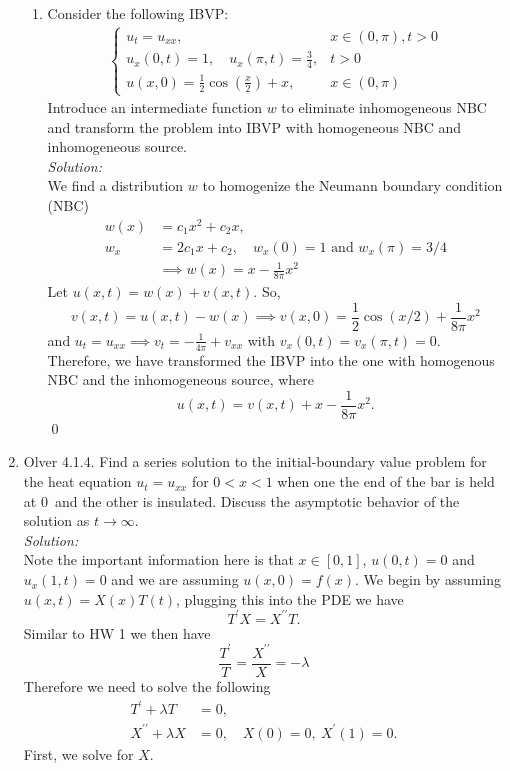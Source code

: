 \documentclass[10pt]{amsart}
\theoremstyle{nonumberplain}
\begin{document}
\begin{enumerate}[label={\bf {\arabic*}:}]
\begin{enumerate}
\item Consider the following IBVP:
\begin{align*}
\begin{cases}
u_t = u_{xx}, &x \in (0, \pi), t > 0 \\
u_x(0, t) = 1, \quad u_x(\pi, t) = \frac 3 4, & t > 0 \\
u(x, 0) = \frac 1 2 \cos \left( \frac x 2 \right) + x, &x \in (0, \pi)
\end{cases}
\end{align*}
Introduce an intermediate function $w$ to eliminate inhomogeneous NBC and transform the problem into IBVP with homogeneous NBC and inhomogeneous source. \\

\noindent
\textit{Solution:} \\
We find a distribution $w$ to homogenize the Neumann boundary condition (NBC)
\begin{align*}
w(x) &= c_1x^2 + c_2x, \\
w_x &= 2c_1x + c_2, \quad w_x(0) = 1 \text{ and } w_x(\pi) = 3/4 \\
&\implies w(x) = x- \frac 1 {8 \pi}x^2
\end{align*}
Let $u(x, t) = w(x) + v(x, t)$.
So, 
$$
v(x, t) = u(x, t) - w(x) \implies v(x, 0) = \frac 1 2 \cos (x/2) + \frac 1 {8 \pi} x^2
$$
and $u_t = u_{xx} \implies v_t = -\frac 1 {4 \pi} + v_{xx}$ with $v_x(0, t) = v_x(\pi, t) = 0$.
Therefore, we have transformed the IBVP into the one with homogenous NBC and the inhomogeneous source, where
$$
u(x, t) = v(x, t) + x - \frac 1 {8 \pi}x^2.
$$
\qed \\

\end{enumerate}

\newpage

\item Olver 4.1.4. Find a series solution to the initial-boundary value problem for the heat equation $u_t = u_{xx}$ for $0 < x < 1$ when one the end of the bar is held at 0\textdegree \, and the other is insulated.
Discuss the asymptotic behavior of the solution as $t \rightarrow \infty$. \\

\noindent
\textit{Solution:} \\
Note the important information here is that $x \in [0, 1]$, $u(0, t) = 0$ and $u_x(1, t) = 0$ and we are assuming $u(x, 0) = f(x)$.
We begin by assuming $u(x, t) = X(x)T(t)$, plugging this into the PDE we have
$$
T^\prime X = X^{\prime\prime}T.
$$
Similar to HW 1 we then have
$$
\frac {T^\prime}T = \frac {X^{\prime\prime}} X = -\lambda
$$
Therefore we need to solve the following
\begin{align*}
T^\prime + \lambda T &= 0, \\
X^{\prime\prime} + \lambda X &= 0, \quad X(0) = 0, \: X^\prime(1) = 0.
\end{align*}
First, we solve for $X$. \\


\end{enumerate}
\end{document}
